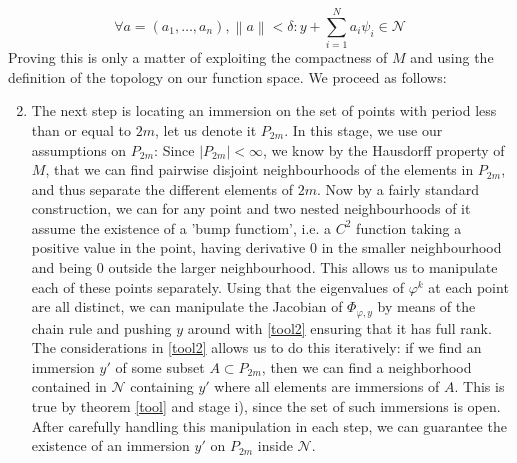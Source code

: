 \documentclass[11pt, a4paper]{memoir}
\theoremstyle{break}
\theoremstyle{break}
\theoremstyle{nonumberplain}
\newcommand{\norm}[1]{\left\lVert#1\right\rVert}
\begin{document}
\begin{equation}\label{tool2}
\forall a=(a_1,\ldots,a_n),\norm{a}< \delta: y+\sum_{i=1}^N a_i\psi_i\in \mathcal{N}
\end{equation}
Proving this is only a matter of exploiting the compactness of $M$ and using the definition of the topology on our function space. We proceed as follows:
\begin{enumerate}[label=\roman*)]
	\setcounter{enumi}{1}
	\item The next step is locating an immersion on the set of points with period less than or equal to $2m$, let us denote it $P_{2m}$. In this stage, we use our assumptions on $P_{2m}$: Since $|P_{2m}|<\infty$, we know by the Hausdorff property of $M$, that we can find pairwise disjoint neighbourhoods of the elements in $P_{2m}$, and thus separate the different elements of $2m$. Now by a fairly standard construction, we can for any point and two nested neighbourhoods of it assume the existence of a 'bump functiom', i.e. a $C^2$ function taking a positive value in the point, having derivative 0 in the smaller neighbourhood and being 0 outside the larger neighbourhood. This allows us to manipulate each of these points separately. Using that the eigenvalues of $\varphi^k$ at each point are all distinct, we can manipulate the Jacobian of $\Phi_{\varphi,y}$ by means of the chain rule and pushing $y$ around with \ref{tool2} ensuring that it has full rank. The considerations in \ref{tool2} allows us to do this iteratively: if we find an immersion $y'$ of some subset $A\subset P_{2m}$, then we can find a neighborhood contained in $\mathcal{N}$ containing $y'$ where all elements are immersions of $A$. This is true by theorem \ref{tool} and stage i), since the set of such immersions is open. After carefully handling this manipulation in each step, we can guarantee the existence of an immersion $y'$ on $P_{2m}$ inside $\mathcal{N}$.

\end{enumerate}
\end{document}

